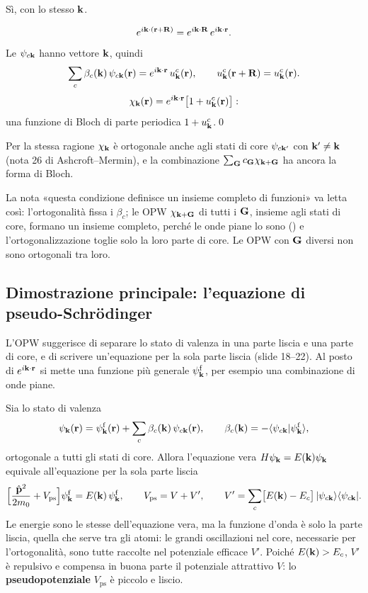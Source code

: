 \documentclass[11pt,a4paper]{article}
\begin{document}
Sì, con lo stesso $\mathbf k$.
\begin{dimostrazione}
\[
e^{i\mathbf k\cdot(\mathbf r+\mathbf R)}=e^{i\mathbf k\cdot\mathbf R}\,e^{i\mathbf k\cdot\mathbf r}.
\]
Le $\psi_{c\mathbf k}$ hanno vettore $\mathbf k$, quindi
\[
\sum_c\beta_c(\mathbf k)\,\psi_{c\mathbf k}(\mathbf r)=e^{i\mathbf k\cdot\mathbf r}\,u^c_{\mathbf k}(\mathbf r),\qquad u^c_{\mathbf k}(\mathbf r+\mathbf R)=u^c_{\mathbf k}(\mathbf r).
\]
\[
\chi_{\mathbf k}(\mathbf r)=e^{i\mathbf k\cdot\mathbf r}\bigl[1+u^c_{\mathbf k}(\mathbf r)\bigr]:
\]
una funzione di Bloch di parte periodica $1+u^c_{\mathbf k}$.\qed
\end{dimostrazione}
Per la stessa ragione $\chi_{\mathbf k}$ è ortogonale anche agli stati di core $\psi_{c\mathbf k'}$ con $\mathbf k'\ne\mathbf k$ (nota 26 di Ashcroft--Mermin), e la
combinazione $\sum_{\mathbf G}c_{\mathbf G}\chi_{\mathbf k+\mathbf G}$ ha ancora la forma di Bloch.

\begin{osservazione}[slide 11]
La nota «questa condizione definisce un insieme completo di funzioni» va letta così: l'ortogonalità fissa i $\beta_c$; le OPW $\chi_{\mathbf k+\mathbf G}$ di tutti i
$\mathbf G$, insieme agli stati di core, formano un insieme completo, perché le onde piane lo sono () e l'ortogonalizzazione toglie solo la
loro parte di core. Le OPW con $\mathbf G$ diversi non sono ortogonali tra loro.
\end{osservazione}

\subsection{Dimostrazione principale: l'equazione di pseudo-Schrödinger}\label{sec:pseudodim}
L'OPW suggerisce di separare lo stato di valenza in una parte liscia e una parte di core, e di scrivere un'equazione per la sola parte liscia
(slide 18--22). Al posto di $e^{i\mathbf k\cdot\mathbf r}$ si mette una funzione più generale $\psi^{\mathrm f}_{\mathbf k}$, per esempio una combinazione di onde piane.

\begin{teorema}\label{teo:pseudo}
Sia lo stato di valenza
\[
\psi_{\mathbf k}(\mathbf r)=\psi^{\mathrm f}_{\mathbf k}(\mathbf r)+\sum_c\beta_c(\mathbf k)\,\psi_{c\mathbf k}(\mathbf r),\qquad \beta_c(\mathbf k)=-\langle\psi_{c\mathbf k}|\psi^{\mathrm f}_{\mathbf k}\rangle,
\]
ortogonale a tutti gli stati di core. Allora l'equazione vera $H\psi_{\mathbf k}=E(\mathbf k)\psi_{\mathbf k}$ equivale all'equazione per la sola parte liscia
\[
\Bigl[\frac{\hat{\mathbf p}^2}{2m_0}+V_{\mathrm{ps}}\Bigr]\psi^{\mathrm f}_{\mathbf k}=E(\mathbf k)\,\psi^{\mathrm f}_{\mathbf k},\qquad V_{\mathrm{ps}}=V+V',\qquad
V'=\sum_c\bigl[E(\mathbf k)-E_c\bigr]\,|\psi_{c\mathbf k}\rangle\langle\psi_{c\mathbf k}| .
\]
\tcblower
Le energie sono le stesse dell'equazione vera, ma la funzione d'onda è solo la parte liscia, quella che serve tra gli atomi: le grandi oscillazioni
nel core, necessarie per l'ortogonalità, sono tutte raccolte nel potenziale efficace $V'$. Poiché $E(\mathbf k)>E_c$, $V'$ è repulsivo e compensa in buona
parte il potenziale attrattivo $V$: lo \textbf{pseudopotenziale} $V_{\mathrm{ps}}$ è piccolo e liscio.
\end{teorema}
\end{document}
